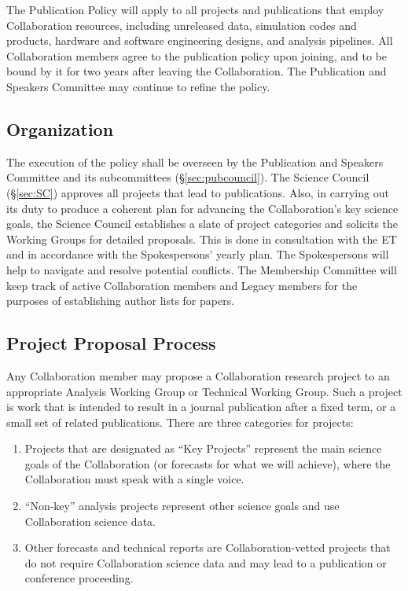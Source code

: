 \documentclass[12pt]{article}
\begin{document}
The Publication Policy will apply to all projects and publications that employ Collaboration resources, including unreleased data, simulation codes and products, hardware and software engineering designs, and analysis pipelines. All Collaboration members agree to the publication policy upon joining, and to be bound by it for two years after leaving the Collaboration. The Publication and Speakers Committee may continue to refine the policy.
\subsection{Organization}

The execution of the policy shall be overseen by the Publication and Speakers Committee and its subcommittees (\S\ref{sec:pubcouncil}). The Science Council (\S\ref{sec:SC}) approves all projects that lead to publications. Also, in carrying out its duty to produce a coherent plan for advancing the Collaboration's key science goals, the Science Council establishes a slate of project categories and solicits the Working Groups for detailed proposals. This is done in consultation with the ET and in accordance with the Spokespersons' yearly plan. The Spokespersons will help to navigate and resolve potential conflicts. The Membership Committee will keep track of active Collaboration members and Legacy members for the purposes of establishing author lists for papers.

\subsection{Project Proposal Process}
\label{sec:pubprop}

Any Collaboration member may propose a Collaboration research project to an appropriate Analysis Working Group or Technical Working Group.  Such a project is work that is intended to result in a journal publication after a fixed term, or a small set of related publications.  There are three categories for projects:
\begin{enumerate}

\item Projects that are designated as ``Key Projects'' represent the main science goals of the Collaboration (or forecasts for what we will achieve), where the Collaboration must speak with a single voice.  

\item ``Non-key''  analysis projects represent other science goals and use Collaboration science data.  

\item Other forecasts and technical reports are Collaboration-vetted projects that do not require Collaboration science data and may lead to a publication or conference proceeding.  

\end{enumerate}
\end{document}

